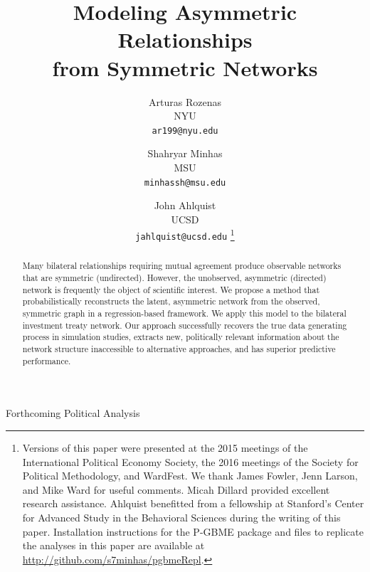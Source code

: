 \documentclass[a4paper, 12pt]{article}
\begin{document}
\title{{\bf Modeling Asymmetric Relationships \\ from Symmetric Networks}}

\author{
  Arturas Rozenas\\
{\small NYU}\\
  {\small \texttt{ar199@nyu.edu}}
\and
  Shahryar Minhas\\
{\small MSU}\\
  {\small \texttt{minhassh@msu.edu}}
  \and
  John Ahlquist\\
{\small UCSD}\\
  {\small \texttt{jahlquist@ucsd.edu}}
\thanks{Versions of this paper were presented at the 2015 meetings of the International Political Economy Society, the 2016 meetings of the Society for Political Methodology, and WardFest.  We thank James Fowler, Jenn Larson, and Mike Ward for useful comments. Micah Dillard provided excellent research assistance.  Ahlquist benefitted from a fellowship at Stanford's Center for Advanced Study in the Behavioral Sciences during the writing of this paper.  Installation instructions for the P-GBME package and files to replicate the analyses in this paper are available at \url{http://github.com/s7minhas/pgbmeRepl}.}}

\maketitle 

\begin{center}
  \Large{Forthcoming Political Analysis}
\end{center}

\thispagestyle{empty}

\bigskip

\begin{abstract}
 \noindent Many bilateral relationships requiring mutual agreement produce observable networks that are symmetric (undirected). However, the unobserved, asymmetric (directed) network is frequently the object of scientific interest. We propose a method that probabilistically reconstructs the latent, asymmetric network from the observed, symmetric graph in a regression-based framework. We apply this model to the bilateral investment treaty network. Our approach successfully recovers the true data generating process in simulation studies, extracts new, politically relevant information about the network structure inaccessible to alternative approaches, and has superior predictive performance. 
\end{abstract}
\end{document}
